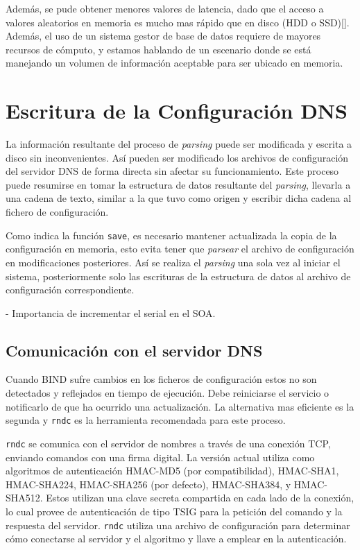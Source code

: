 Además, se pude obtener menores valores de latencia, dado que el acceso a valores aleatorios en memoria es mucho mas rápido que en disco (HDD o SSD)[\cite{jacobs2009pathologies}]. Además, el uso de un sistema gestor de base de datos requiere de mayores recursos de cómputo, y estamos hablando de un escenario donde se está manejando un volumen de información aceptable para ser ubicado en memoria.

\section{Escritura de la Configuración DNS}

La información resultante del proceso de \textit{parsing} puede ser modificada y escrita a disco sin inconvenientes. Así pueden ser modificado los archivos de configuración del servidor DNS de forma directa sin afectar su funcionamiento. Este proceso puede resumirse en tomar la estructura de datos resultante del \textit{parsing}, llevarla a una cadena de texto, similar a la que tuvo como origen y escribir dicha cadena al fichero de configuración.

Como indica la función \verb+save+, es necesario mantener actualizada la copia de la configuración en memoria, esto evita tener que \textit{parsear} el archivo de configuración en modificaciones posteriores. Así se realiza el \textit{parsing} una sola vez al iniciar el sistema, posteriormente solo las escrituras de la estructura de datos al archivo de configuración correspondiente.

- Importancia de incrementar el serial en el SOA.

\subsection{Comunicación con el servidor DNS}

Cuando BIND sufre cambios en los ficheros de configuración estos no son detectados y reflejados en tiempo de ejecución. Debe reiniciarse el servicio o notificarlo de que ha ocurrido una actualización. La alternativa mas eficiente es la segunda y \verb+rndc+ es la herramienta recomendada para este proceso.

\verb+rndc+ se comunica con el servidor de nombres a través de una conexión TCP, enviando comandos con una firma digital. La versión actual utiliza como algoritmos de autenticación HMAC-MD5 (por compatibilidad), HMAC-SHA1, HMAC-SHA224, HMAC-SHA256 (por defecto), HMAC-SHA384, y HMAC-SHA512. Estos utilizan una clave secreta compartida en cada lado de la conexión, lo cual provee de autenticación de tipo TSIG para la petición del comando y la respuesta del servidor. \verb+rndc+ utiliza una archivo de configuración para determinar cómo conectarse al servidor y el algoritmo y llave a emplear en la autenticación.

